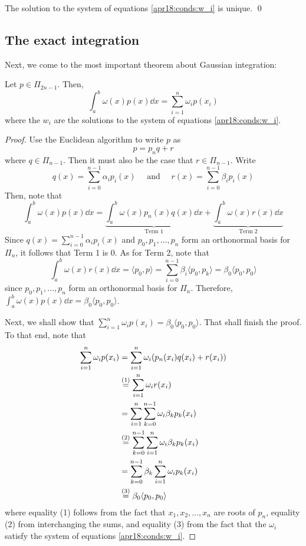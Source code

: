 \begin{corr}
  The solution to the system of equations \ref{apr18:conds:w_i} is unique. \qed
\end{corr}

\subsection{The exact integration}

Next, we come to the most important theorem about Gaussian integration:
\begin{thm}
  \label{apr18:thm:main}
  Let $p \in \Pi_{2n-1}$. Then,
  \[
    \int_a^b \omega(x) p(x) \dd{x} = \sum_{i=1}^n \omega_i p(x_i)
  \]
  where the $w_i$ are the solutions to the system of equations \ref{apr18:conds:w_i}.
\end{thm}
\begin{proof}
Use the Euclidean algorithm to write $p$ as
\[
  p = p_nq + r
\]
where $q \in \Pi_{n-1}$. Then it must also be the case that $r \in \Pi_{n-1}$. Write
\[
  q(x) = \sum_{i = 0}^{n-1} \alpha_i p_i(x)
  \quad \text{ and } \quad
  r(x) = \sum_{i = 0}^{n-1} \beta_i p_i(x)
\]
Then, note that
\[
  \int_a^b \omega(x) p(x) \dd{x} =
  \underbrace{\int_a^b \omega(x) p_n(x) q(x) \dd{x}}_{\text{Term 1}}
  + \underbrace{\int_a^b \omega(x) r(x) \dd{x}}_{\text{Term 2}}
\]
Since $q(x) = \sum_{i = 0}^{n-1} \alpha_i p_i(x)$ and $p_0, p_1, \dots , p_n$ form an orthonormal basis for $\Pi_n$, it follows that Term 1 is 0. As for Term 2, note that
\[
  \int_a^b \omega(x) r(x) \dd{x}
  =
  \langle p_0, p \rangle
  =
  \sum_{i=0}^{n-1} \beta_i \langle p_0, p_k \rangle
  =
  \beta_0 \langle p_0, p_0 \rangle
\]
since $p_0, p_1, \dots , p_n$ form an orthonormal basis for $\Pi_n$. Therefore, $\int_a^b \omega(x) p(x) \dd{x} = \beta_0 \langle p_0, p_0 \rangle$.

Next, we shall show that $\sum_{i=1}^n \omega_i p(x_i) = \beta_0 \langle p_0, p_0 \rangle$. That shall finish the proof. To that end, note that
\begin{align*}
  \sum_{i=1}^n \omega_i p(x_i)
  &=
    \sum_{i=1}^n \omega_i(p_n(x_i)q(x_i) + r(x_i)) \\
  &\overset{(1)}{=}
    \sum_{i=1}^n \omega_i r(x_i) \\
  &=
    \sum_{i=1}^n \sum_{k = 0}^{n-1} \omega_i \beta_k p_k(x_i) \\
  &\overset{(2)}{=}
    \sum_{k = 0}^{n-1} \sum_{i=1}^n \omega_i \beta_k p_k(x_i) \\
  &=
    \sum_{k = 0}^{n-1} \beta_k \sum_{i=1}^n \omega_i p_k(x_i) \\
  &\overset{(3)}{=}
    \beta_0 \langle p_0, p_0 \rangle
\end{align*}
where equality (1) follows from the fact that $x_1, x_2, \dots , x_n$ are roots of $p_n$, equality (2) from interchanging the sums, and equality (3) from the fact that the $\omega_i$ satisfy the system of equations \ref{apr18:conds:w_i}.
\hfill
\end{proof}

